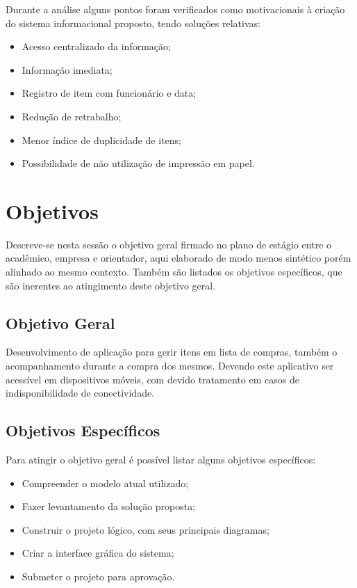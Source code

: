 \documentclass[
	12pt,
	openright,
	oneside, %
	a4paper,
	chapter=TITLE,
	section=TITLE,
	english,
	brazil %
	]{abntex2-udesc}
\begin{document}
Durante a análise alguns pontos foram verificados como motivacionais à criação do sistema informacional proposto, tendo soluções relativas:

\begin{itemize}
\item Acesso centralizado da informação;
\item Informação imediata;
\item Registro de item com funcionário e data;
\item Redução de retrabalho;
\item Menor índice de duplicidade de itens;
\item Possibilidade de não utilização de impressão em papel.
\end{itemize}

\section{Objetivos}

Descreve-se nesta sessão o objetivo geral firmado no plano de estágio entre o acadêmico, empresa e orientador, aqui elaborado de modo menos sintético porém alinhado ao mesmo contexto. Também são listados os objetivos específicos, que são inerentes ao atingimento deste objetivo geral.

\subsection{Objetivo Geral}

Desenvolvimento de aplicação para gerir itens em lista de compras, também o acompanhamento durante a compra dos mesmos. Devendo este aplicativo ser acessível em dispositivos móveis, com devido tratamento em casos de indisponibilidade de conectividade.

\subsection{Objetivos Específicos}

Para atingir o objetivo geral é possível listar alguns objetivos específicos:

\begin{itemize}
\item Compreender o modelo atual utilizado;
\item Fazer levantamento da solução proposta;
\item Construir o projeto lógico, com seus principais diagramas;
\item Criar a interface gráfica do sistema;
\item Submeter o projeto para aprovação.
\end{itemize}
\end{document}
